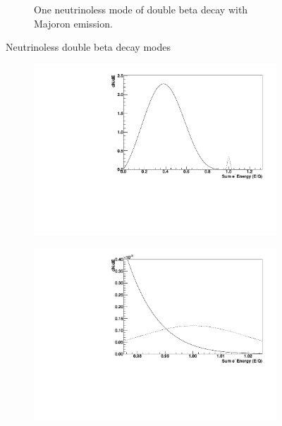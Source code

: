 \documentclass[herrin-thesis.tex]{subfiles}
\begin{document}
\begin{figure}[tbp]
\begin{subfigure}[b]{0.48\textwidth}
		\caption[Diagram of \(0\nu\beta\beta\chi^0\)]{One neutrinoless mode of double beta decay with Majoron emission.}
		\label{fig:nu_diagram_0nubbX}
	\end{subfigure}
	\caption[Neutrinoless double beta decay modes]{Neutrinoless double beta decay modes}
	\label{fig:nu_diagrams}
\end{figure}

\begin{figure}[tbp]
         \begin{subfigure}[b]{0.48\textwidth}
		\centering
		\includegraphics[width=\textwidth]{./plots/nu_comp_2nu_0nu_1e2.pdf}
	\end{subfigure}\hfill%
         \begin{subfigure}[b]{0.48\textwidth}
		\centering
		\includegraphics[width=\textwidth]{./plots/nu_comp_2nu_0nu_1e6.pdf}

\end{subfigure}
\end{figure}
\end{document}
